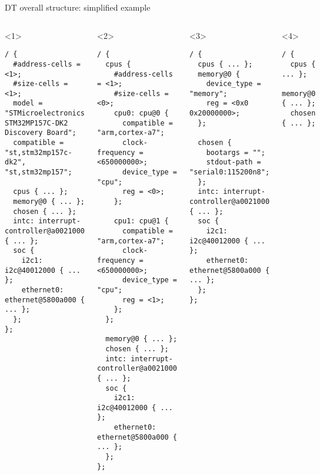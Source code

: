 \begin{frame}[fragile]{DT overall structure: simplified example}
  \begin{columns}[T]
    \begin{onlyenv}<1>
      \begin{block}{}
\begin{verbatim}
/ {
  #address-cells = <1>;
  #size-cells = <1>;
  model = "STMicroelectronics STM32MP157C-DK2 Discovery Board";
  compatible = "st,stm32mp157c-dk2", "st,stm32mp157";

  cpus { ... };
  memory@0 { ... };
  chosen { ... };
  intc: interrupt-controller@a0021000 { ... };
  soc {
    i2c1: i2c@40012000 { ... };
    ethernet0: ethernet@5800a000 { ... };
  };
};
\end{verbatim}
      \end{block}
    \end{onlyenv}
    \begin{onlyenv}<2>
      \begin{block}{}
\begin{verbatim}
/ {
  cpus {
    #address-cells = <1>;
    #size-cells = <0>;
    cpu0: cpu@0 {
      compatible = "arm,cortex-a7";
      clock-frequency = <650000000>;
      device_type = "cpu";
      reg = <0>;
    };

    cpu1: cpu@1 {
      compatible = "arm,cortex-a7";
      clock-frequency = <650000000>;
      device_type = "cpu";
      reg = <1>;
    };
  };

  memory@0 { ... };
  chosen { ... };
  intc: interrupt-controller@a0021000 { ... };
  soc {
    i2c1: i2c@40012000 { ... };
    ethernet0: ethernet@5800a000 { ... };
  };
};
\end{verbatim}
      \end{block}
    \end{onlyenv}
    \begin{onlyenv}<3>
      \begin{block}{}
\begin{verbatim}
/ {
  cpus { ... };
  memory@0 {
    device_type = "memory";
    reg = <0x0 0x20000000>;
  };

  chosen {
    bootargs = "";
    stdout-path = "serial0:115200n8";
  };
  intc: interrupt-controller@a0021000 { ... };
  soc {
    i2c1: i2c@40012000 { ... };
    ethernet0: ethernet@5800a000 { ... };
  };
};
\end{verbatim}
      \end{block}
    \end{onlyenv}
    \begin{onlyenv}<4>
      \begin{block}{}
\begin{verbatim}
/ {
  cpus { ... };
  memory@0 { ... };
  chosen { ... };


\end{verbatim}
\end{block}
\end{onlyenv}
\end{columns}
\end{frame}
